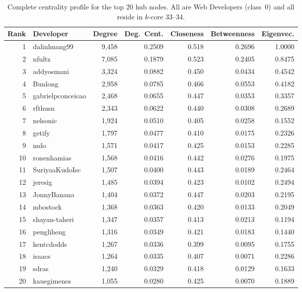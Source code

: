 \documentclass[letterpaper]{article}
\begin{document}
\begin{table}[H]
  \centering
  \small
  \begin{tabular}{rlrrrrr}
    \toprule
    \textbf{Rank} & \textbf{Developer} & \textbf{Degree} & \textbf{Deg.\ Cent.} & \textbf{Closeness} & \textbf{Betweenness} & \textbf{Eigenvec.} \\
    \midrule
    1  & dalinhuang99      & 9,458 & 0.2509 & 0.518 & 0.2696 & 1.0000 \\
    2  & nfultz            & 7,085 & 0.1879 & 0.523 & 0.2405 & 0.8475 \\
    3  & addyosmani        & 3,324 & 0.0882 & 0.450 & 0.0434 & 0.4542 \\
    4  & Bunlong           & 2,958 & 0.0785 & 0.466 & 0.0553 & 0.4182 \\
    5  & gabrielpconceicao & 2,468 & 0.0655 & 0.447 & 0.0353 & 0.3357 \\
    6  & rfthusn           & 2,343 & 0.0622 & 0.440 & 0.0308 & 0.2689 \\
    7  & nelsonic          & 1,924 & 0.0510 & 0.405 & 0.0258 & 0.1552 \\
    8  & getify            & 1,797 & 0.0477 & 0.410 & 0.0175 & 0.2326 \\
    9  & mdo               & 1,571 & 0.0417 & 0.425 & 0.0153 & 0.2285 \\
    10 & ronenhamias       & 1,568 & 0.0416 & 0.442 & 0.0276 & 0.1975 \\
    11 & SuriyaaKudoIsc    & 1,507 & 0.0400 & 0.443 & 0.0189 & 0.2464 \\
    12 & jeresig           & 1,485 & 0.0394 & 0.423 & 0.0102 & 0.2494 \\
    13 & JonnyBanana       & 1,404 & 0.0372 & 0.447 & 0.0203 & 0.2195 \\
    14 & mbostock          & 1,368 & 0.0363 & 0.420 & 0.0133 & 0.2049 \\
    15 & shayan-taheri     & 1,347 & 0.0357 & 0.413 & 0.0213 & 0.1194 \\
    16 & pengliheng        & 1,316 & 0.0349 & 0.421 & 0.0183 & 0.1440 \\
    17 & kentcdodds        & 1,267 & 0.0336 & 0.399 & 0.0095 & 0.1755 \\
    18 & isaacs            & 1,264 & 0.0335 & 0.407 & 0.0071 & 0.2286 \\
    19 & sdras             & 1,240 & 0.0329 & 0.418 & 0.0129 & 0.1633 \\
    20 & kauegimenes       & 1,055 & 0.0280 & 0.425 & 0.0070 & 0.1889 \\
    \bottomrule
  \end{tabular}
  \caption{Complete centrality profile for the top 20 hub nodes. All are Web Developers (class~0) and all reside in $k$-core 33--34.}
  \label{tab:centrality_full}
\end{table}
\end{document}
